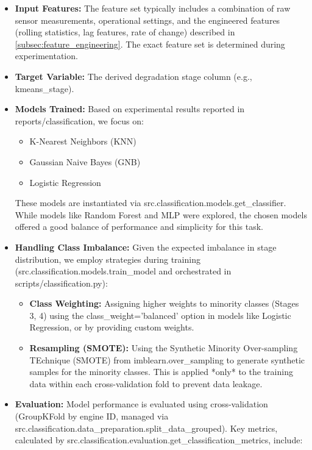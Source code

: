 \begin{itemize}
	\item \textbf{Input Features:} The feature set typically includes a combination of raw sensor measurements, operational settings, and the engineered features (rolling statistics, lag features, rate of change) described in \cref{subsec:feature_engineering}. The exact feature set is determined during experimentation.
	\item \textbf{Target Variable:} The derived degradation stage column (e.g., kmeans\_stage).
	\item \textbf{Models Trained:} Based on experimental results reported in reports/classification, we focus on:
	      \begin{itemize}
		      \item K-Nearest Neighbors (KNN)
		      \item Gaussian Naive Bayes (GNB)
		      \item Logistic Regression
	      \end{itemize}
	      These models are instantiated via src.classification.models.get\_classifier. While models like Random Forest and MLP were explored, the chosen models offered a good balance of performance and simplicity for this task.
	\item \textbf{Handling Class Imbalance:} Given the expected imbalance in stage distribution, we employ strategies during training (src.classification.models.train\_model and orchestrated in scripts/classification.py):
	      \begin{itemize}
		      \item \textbf{Class Weighting:} Assigning higher weights to minority classes (Stages 3, 4) using the class\_weight='balanced' option in models like Logistic Regression, or by providing custom weights.
		      \item \textbf{Resampling (SMOTE):} Using the Synthetic Minority Over-sampling TEchnique (SMOTE) from imblearn.over\_sampling to generate synthetic samples for the minority classes. This is applied *only* to the training data within each cross-validation fold to prevent data leakage.
	      \end{itemize}
	\item \textbf{Evaluation:} Model performance is evaluated using cross-validation (GroupKFold by engine ID, managed via src.classification.data\_preparation.split\_data\_grouped). Key metrics, calculated by src.classification.evaluation.get\_classification\_metrics, include:
	      \begin{itemize}

\end{itemize}
\end{itemize}
